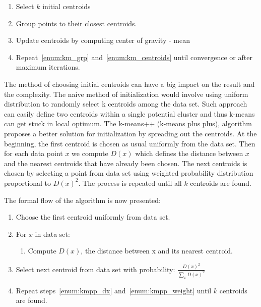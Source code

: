 \documentclass{article}
\begin{document}
\begin{center}


\begin{enumerate}
	\item 
		Select $k$ initial centroids
	\item \label{enum:km_grp} 
		Group points to their closest centroids.
	\item \label{enum:km_centroids} 
		Update centroids by computing center of gravity - mean
	\item 
		Repeat~\ref{enum:km_grp} and~\ref{enum:km_centroids} until convergence or after maximum iterations.
\end{enumerate}

\end{center}

The method of choosing initial centroids can have a big impact on the result and the complexity. The naive method of initialization would involve using uniform distribution to randomly select k centroids among the data set. Such approach can easily define two centroids within a single potential cluster and thus k-means can get stuck in local optimum.
The k-means++ (k-means plus plus), algorithm proposes a better solution for initialization by spreading out the centroids. At the beginning, the first centroid is chosen as usual uniformly from the data set. Then for each data point $x$ we compute $D(x)$ which defines the distance between $x$ and the nearest centroids that have already been chosen. The next centroids is chosen by selecting a point from data set using weighted probability distribution proportional to $D(x)^2$. The process is repeated until all $k$ centroids are found.

The formal flow of the algorithm is now presented:

\begin{enumerate}
	\item 
		Choose the first centroid uniformly from data set.
	\item \label{enum:kmpp_dx}
		For $x$ in data set:
		\begin{enumerate}
			\item
				Compute $D(x)$, the distance between x and its nearest centroid.
		\end{enumerate}
		
	\item \label{enum:kmpp_weight}
		Select next centroid from data set with probability:
		$\frac{D(x)^2}{\sum_{x}D(x)^2}$
	\item 
		Repeat steps~\ref{enum:kmpp_dx} and~\ref{enum:kmpp_weight} until $k$ centroids are found.
\end{enumerate}
\end{document}
